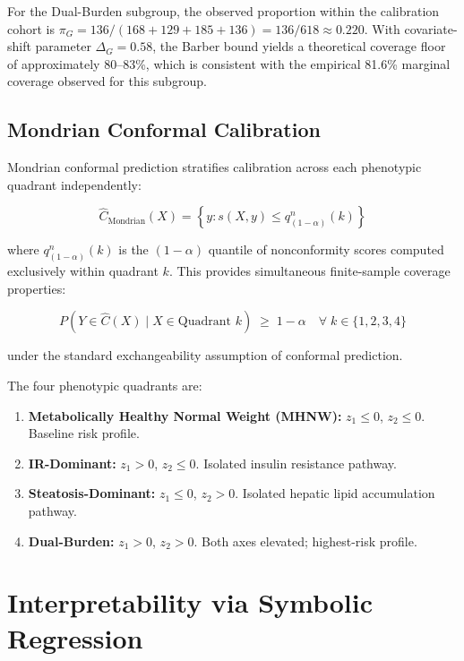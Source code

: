\documentclass[12pt,a4paper,oneside]{report}
\begin{document}
For the Dual-Burden subgroup, the observed proportion within the calibration cohort is $\pi_G = 136 / (168 + 129 + 185 + 136) = 136/618 \approx 0.220$. With covariate-shift parameter $\Delta_G = 0.58$, the Barber bound yields a theoretical coverage floor of approximately 80--83\%, which is consistent with the empirical 81.6\% marginal coverage observed for this subgroup.

\subsection{Mondrian Conformal Calibration}

Mondrian conformal prediction stratifies calibration across each phenotypic quadrant independently:
\begin{equationbox}
\[
\hat{C}_{\text{Mondrian}}(X) = \left\{ y : s(X,y) \leq q^{n}_{(1-\alpha)}(k) \right\}
\]\vspace{-6pt}
\end{equationbox}

where $q^n_{(1-\alpha)}(k)$ is the $(1-\alpha)$ quantile of nonconformity scores computed exclusively within quadrant $k$. This provides simultaneous finite-sample coverage properties:
\begin{equationbox}
\[
P(Y \in \hat{C}(X) \mid X \in \text{Quadrant } k) \;\geq\; 1-\alpha \quad \forall\; k \in \{1,2,3,4\}
\]\vspace{-6pt}
\end{equationbox}
under the standard exchangeability assumption of conformal prediction.

The four phenotypic quadrants are:
\begin{enumerate}[leftmargin=*]
    \item \textbf{Metabolically Healthy Normal Weight (MHNW):} $z_1 \leq 0$, $z_2 \leq 0$. Baseline risk profile.
    \item \textbf{IR-Dominant:} $z_1 > 0$, $z_2 \leq 0$. Isolated insulin resistance pathway.
    \item \textbf{Steatosis-Dominant:} $z_1 \leq 0$, $z_2 > 0$. Isolated hepatic lipid accumulation pathway.
    \item \textbf{Dual-Burden:} $z_1 > 0$, $z_2 > 0$. Both axes elevated; highest-risk profile.
\end{enumerate}

\section{Interpretability via Symbolic Regression}
\end{document}
